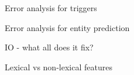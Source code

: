 Error analysis for triggers

Error analysis for entity prediction

IO - what all does it fix?

Lexical vs non-lexical features